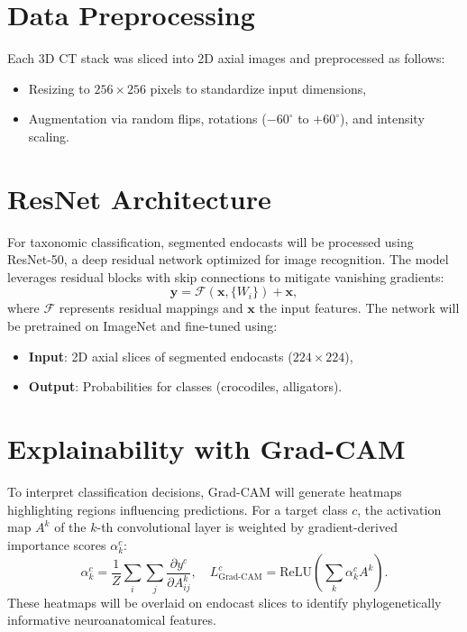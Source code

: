 \section{Data Preprocessing}  
Each 3D CT stack was sliced into 2D axial images and preprocessed as follows:  
\begin{itemize}  
    \item Resizing to \(256 \times 256\) pixels to standardize input dimensions,  
    \item Augmentation via random flips, rotations (\(-60^\circ\) to \(+60^\circ\)), and intensity scaling.  
\end{itemize}  


\section{ResNet Architecture}  
For taxonomic classification, segmented endocasts will be processed using ResNet-50, a deep residual network optimized for image recognition. The model leverages residual blocks with skip connections to mitigate vanishing gradients:  
\begin{equation}  
    \mathbf{y} = \mathcal{F}(\mathbf{x}, \{W_i\}) + \mathbf{x},  
\end{equation}  
where \(\mathcal{F}\) represents residual mappings and \(\mathbf{x}\) the input features. The network will be pretrained on ImageNet and fine-tuned using:  
\begin{itemize}  
    \item \textbf{Input}: 2D axial slices of segmented endocasts (\(224 \times 224\)),  
    \item \textbf{Output}: Probabilities for classes (crocodiles, alligators).  
\end{itemize}  

\section{Explainability with Grad-CAM}  
To interpret classification decisions, Grad-CAM \cite{Selvaraju_2017} will generate heatmaps highlighting regions influencing predictions. For a target class \(c\), the activation map \(A^k\) of the \(k\)-th convolutional layer is weighted by gradient-derived importance scores \(\alpha_k^c\):  
\begin{equation}  
    \alpha_k^c = \frac{1}{Z} \sum_{i} \sum_{j} \frac{\partial y^c}{\partial A_{ij}^k}, \quad  
    L_{\text{Grad-CAM}}^c = \text{ReLU}\left( \sum_{k} \alpha_k^c A^k \right).  
\end{equation}  
These heatmaps will be overlaid on endocast slices to identify phylogenetically informative neuroanatomical features.  

